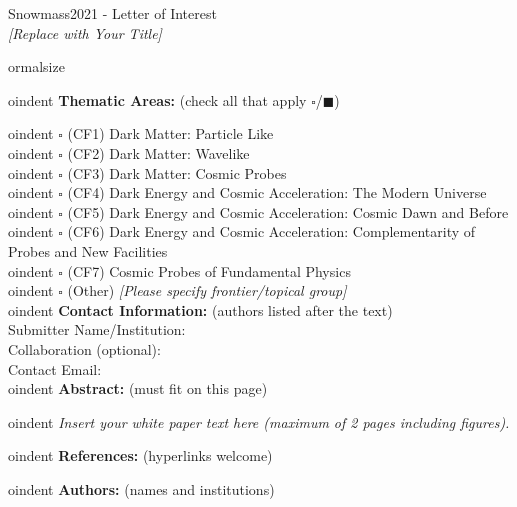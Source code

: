\documentclass[11pt]{article}
\begin{document}
\begin{raggedright} 
\huge
Snowmass2021 - Letter of Interest \hfill \\[+1em]
\textit{[Replace with Your Title]} \hfill \\[+1em]
\end{raggedright}


ormalsize


oindent {\large \bf Thematic Areas:}  (check all that apply $\square$/$\blacksquare$)


oindent $\square$ (CF1) Dark Matter: Particle Like \\

oindent $\square$ (CF2) Dark Matter: Wavelike  \\ 

oindent $\square$ (CF3) Dark Matter: Cosmic Probes  \\

oindent $\square$ (CF4) Dark Energy and Cosmic Acceleration: The Modern Universe \\

oindent $\square$ (CF5) Dark Energy and Cosmic Acceleration: Cosmic Dawn and Before \\

oindent $\square$ (CF6) Dark Energy and Cosmic Acceleration: Complementarity of Probes and New Facilities \\

oindent $\square$ (CF7) Cosmic Probes of Fundamental Physics \\

oindent $\square$ (Other) {\it [Please specify frontier/topical group]} \\


oindent {\large \bf Contact Information:} (authors listed after the text)\\
Submitter Name/Institution: \\
Collaboration (optional): \\
Contact Email: \\


oindent {\large \bf Abstract:} (must fit on this page)

\clearpage


oindent {\it Insert your white paper text here (maximum of 2 pages including figures).}

\clearpage


oindent {\large \bf References:} (hyperlinks welcome)

\vspace{4in}


oindent {\large \bf Authors:} (names and institutions)
\end{document}
